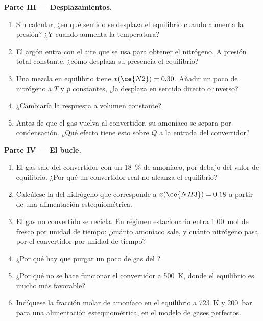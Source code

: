 \begin{problem}
\medskip
\noindent\textbf{Parte III --- Desplazamientos.}
\begin{enumerate}[resume]
  \item Sin calcular, ¿en qué sentido se desplaza el equilibrio cuando
        aumenta la presión? ¿Y cuando aumenta la temperatura?
  \item El argón entra con el aire que se usa para obtener el nitrógeno. A presión total
        constante, ¿cómo desplaza su presencia el equilibrio?
  \item Una mezcla en equilibrio tiene $x(\ce{N2}) = 0.30$. Añadir un poco de
        nitrógeno a $T$ y $p$ constantes, ¿la desplaza en sentido directo o inverso?
  \item ¿Cambiaría la respuesta a volumen constante?
  \item Antes de que el gas vuelva al convertidor, su amoníaco se separa por
        condensación. ¿Qué efecto tiene esto sobre $Q$ a la entrada del convertidor?
\end{enumerate}

\medskip
\noindent\textbf{Parte IV --- El bucle.}
\begin{enumerate}[resume]
  \item El gas sale del convertidor con un \qty{18}{\percent} de amoníaco, por debajo
        del valor de equilibrio. ¿Por qué un convertidor real no alcanza el
        equilibrio?
  \item Calcúlese la  del hidrógeno que corresponde a
        $x(\ce{NH3}) = 0.18$ a partir de una alimentación estequiométrica.
  \item El gas no convertido se recicla. En régimen estacionario entra \qty{1.00}{mol}
        de  fresco por unidad de tiempo: ¿cuánto amoníaco sale, y cuánto
        nitrógeno pasa por el convertidor por unidad de tiempo?
  \item ¿Por qué hay que purgar un poco de gas del ?
  \item ¿Por qué no se hace funcionar el convertidor a \qty{500}{K}, donde el equilibrio es
        mucho más favorable?
  \item Indíquese la fracción molar de amoníaco en el equilibrio a \qty{723}{K} y
        \qty{200}{bar} para una alimentación estequiométrica, en el modelo de gases perfectos.
\end{enumerate}
\end{problem}
